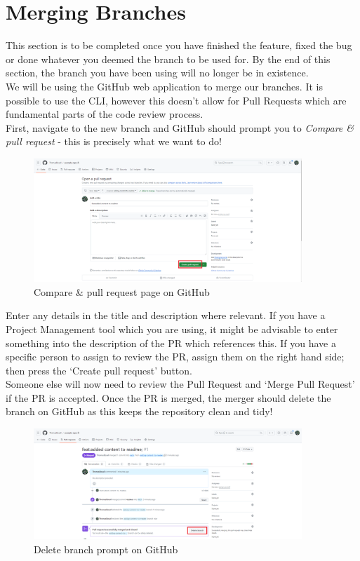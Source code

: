 \documentclass[a4paper, 11pt]{article}
\begin{document}
\section{Merging Branches}
This section is to be completed once you have finished the feature, fixed the bug or done whatever you deemed the branch to be used for. By the end of this section, the branch you have been using will no longer be in existence.\\

We will be using the GitHub web application to merge our branches. It is possible to use the CLI, however this doesn't allow for Pull Requests which are fundamental parts of the code review process.\\

First, navigate to the new branch and GitHub should prompt you to \textit{Compare \& pull request} - this is precisely what we want to do!
\begin{figure}[H]
    \centering
    \includegraphics[width=0.9\textwidth]{assets/gh-compare-pr.png}
    \caption{Compare \& pull request page on GitHub}
\end{figure}

Enter any details in the title and description where relevant. If you have a Project Management tool which you are using, it might be advisable to enter something into the description of the PR which references this. If you have a specific person to assign to review the PR, assign them on the right hand side; then press the `Create pull request' button.\\

Someone else will now need to review the Pull Request and `Merge Pull Request' if the PR is accepted. Once the PR is merged, the merger should delete the branch on GitHub as this keeps the repository clean and tidy!
\begin{figure}[H]
    \centering
    \includegraphics[width=0.9\textwidth]{assets/gh-delete-branch.png}
    \caption{Delete branch prompt on GitHub}
\end{figure}
\end{document}
